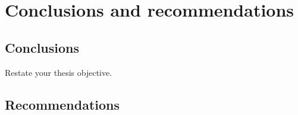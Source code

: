 \chapter{Conclusions and recommendations}
\label{chap: conclusions}
\thispagestyle{empty}

\section{Conclusions}

\lipsum[20-23]
Restate your thesis objective.

\vspace*{3mm}





\section{Recommendations}

\lipsum[1-4]